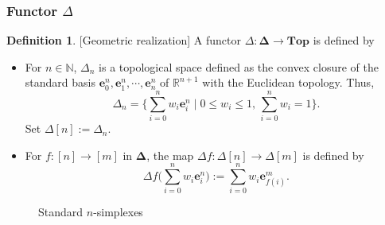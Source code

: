 \documentclass[12pt, a4paper]{amsart}
\theoremstyle{plain}
\theoremstyle{definition}
\newtheorem{defn}[thm]{Definition}
\numberwithin{figure}{section}
\numberwithin{table}{section}
\newcommand{\newword}[1]{\textbf{\textit{#1}}}
\numberwithin{equation}{section}
\newcommand{\Top}{\mathbf{Top}}
\newcommand{\bDelta}{\mathbf{\Delta}}
\begin{document}
\subsubsection{Functor $\Delta$}


\begin{defn}{[Geometric realization]}
\label{defn:geomReal}
A functor
$
\Delta :
	\bDelta \to \Top
$
is defined by
	\begin{itemize}
	\item
For 
$n \in \mathbb{N}$,
$\Delta_n$
is a topological space 
defined as
the convex closure of the standard basis
$\mathbf{e}^n_0, \mathbf{e}^n_1, \cdots, \mathbf{e}^n_n$ 
of
$\mathbb{R}^{n+1}$
with the Euclidean topology.
Thus,
\begin{equation}
\label{eq:stdTopNsymplex}
\Delta_n
	=
\big\{
	\sum_{i=0}^n w_i \mathbf{e}^n_i
\mid
	0 \le w_i \le 1, \,
	\sum_{i=0}^n w_i = 1
\big\} .
\end{equation}
Set
$
\Delta[n] := \Delta_n.
$

	\item
For
$
f : [n] \to [m]
$
in $\bDelta$,
the map
$
\Delta f 
	: 
\Delta[n] \to \Delta[m]
$
is defined by
\begin{equation}
\label{eq:deltaFun}
\Delta f
\Big(
\sum_{i=0}^n
	w_i \mathbf{e}^n_i
\Big)
	:=
\sum_{i=0}^n
	w_i \mathbf{e}^m_{f(i)} .
\end{equation}

	\end{itemize}

\begin{figure}[]
\begin{center}
\end{center}
\label{fig:stdNsymplex}
\caption{Standard $n$-simplexes}
\end{figure}


\end{defn}
\end{document}

